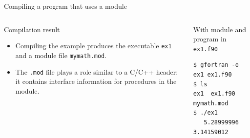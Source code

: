 \begin{frame}[fragile]{Compiling a program that uses a module}
  \begin{columns}[T]
    \begin{block}{Compilation result}
      \begin{itemize}
        \item Compiling the example produces the executable \texttt{ex1} and a module file \texttt{mymath.mod}.
        \item The \texttt{.mod} file plays a role similar to a C/C++ header: it contains interface information for procedures in the module.
      \end{itemize}
    \end{block}

    \begin{block}{With module and program in \texttt{ex1.f90}}
\begin{lstlisting}[language={}]
$ gfortran -o ex1 ex1.f90
$ ls
ex1  ex1.f90  mymath.mod
$ ./ex1
   5.28999996       3.14159012
\end{lstlisting}
    \end{block}
  \end{columns}
\end{frame}

